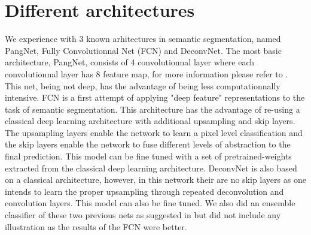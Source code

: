 \documentclass{article}
\begin{document}
\section{Different architectures}
\label{sec:results}
\noindent We experience with 3 known arhitectures in semantic segmentation, named PangNet, Fully Convolutionnal Net (FCN) and DeconvNet. The most basic architecture, PangNet, consists of 4 
convolutionnal layer where each convolutionnal layer has 8 feature map, for more information please refer to \cite{pang2010cell}. 
This net, being not deep, has the advantage of being less 
computationnally intensive. FCN is a first attempt of applying "deep 
feature" representations to the task of semantic segmentation. This 
architecture has the advantage of re-using a classical deep learning 
architecture with additional upsampling and skip layers. The 
upsampling layers enable the network to learn a pixel level classification 
and the skip layers enable the network to fuse different levels of 
abstraction to the final prediction. This model can be fine tuned with a 
set of pretrained-weights extracted from the classical deep learning 
architecture\cite{long2015fcn}. DeconvNet is also based on a classical architecture, 
however, in this network their are no skip layers as one intends to learn 
the proper upsampling through repeated deconvolution and convolution 
layers. This model can also be fine tuned\cite{noh2015learning}. We also did an
ensemble classifier of these two previous nets as suggested in 
\cite{noh2015learning} but did not include any illustration as the results of the FCN were better.
\end{document}
